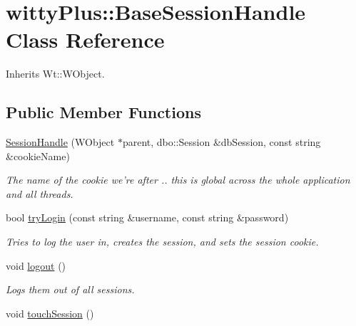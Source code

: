 \hypertarget{classwittyPlus_1_1BaseSessionHandle}{
\section{wittyPlus::BaseSessionHandle Class Reference}
\label{classwittyPlus_1_1BaseSessionHandle}
}


Inherits Wt::WObject.

\subsection*{Public Member Functions}
\begin{DoxyCompactItemize}
\item 
\hypertarget{classwittyPlus_1_1BaseSessionHandle_a6312b94455e0d98fdc4567a2805d73f1}{
\hyperlink{classwittyPlus_1_1BaseSessionHandle_a6312b94455e0d98fdc4567a2805d73f1}{SessionHandle} (WObject $\ast$parent, dbo::Session \&dbSession, const string \&cookieName)}
\label{classwittyPlus_1_1BaseSessionHandle_a6312b94455e0d98fdc4567a2805d73f1}

\begin{DoxyCompactList}\small\item\em The name of the cookie we're after .. this is global across the whole application and all threads. \item\end{DoxyCompactList}\item 
bool \hyperlink{classwittyPlus_1_1BaseSessionHandle_a4311045e6b860faf12792e1ebc4e7aeb}{tryLogin} (const string \&username, const string \&password)
\begin{DoxyCompactList}\small\item\em Tries to log the user in, creates the session, and sets the session cookie. \item\end{DoxyCompactList}\item 
\hypertarget{classwittyPlus_1_1BaseSessionHandle_ae55fed00e54fd69d40d492937fd670de}{
void \hyperlink{classwittyPlus_1_1BaseSessionHandle_ae55fed00e54fd69d40d492937fd670de}{logout} ()}
\label{classwittyPlus_1_1BaseSessionHandle_ae55fed00e54fd69d40d492937fd670de}

\begin{DoxyCompactList}\small\item\em Logs them out of all sessions. \item\end{DoxyCompactList}\item 
\hypertarget{classwittyPlus_1_1BaseSessionHandle_af615709773f63fcefb1e724331ed9b03}{
void \hyperlink{classwittyPlus_1_1BaseSessionHandle_af615709773f63fcefb1e724331ed9b03}{touchSession} ()}
\label{classwittyPlus_1_1BaseSessionHandle_af615709773f63fcefb1e724331ed9b03}


\end{DoxyCompactItemize}
